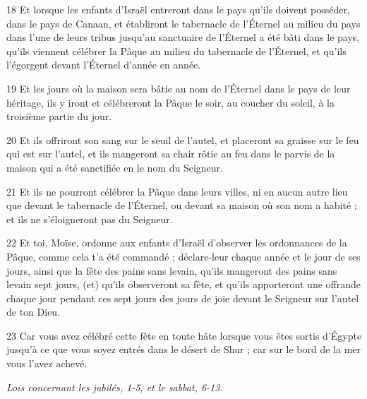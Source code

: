 \par 18 Et lorsque les enfants d'Israël entreront dans le pays qu'ils doivent posséder, dans le pays de Canaan, et établiront le tabernacle de l'Éternel au milieu du pays dans l'une de leurs tribus jusqu'au sanctuaire de l'Éternel a été bâti dans le pays, qu'ils viennent célébrer la Pâque au milieu du tabernacle de l'Éternel, et qu'ils l'égorgent devant l'Éternel d'année en année.
\par 19 Et les jours où la maison sera bâtie au nom de l'Éternel dans le pays de leur héritage, ils y iront et célébreront la Pâque le soir, au coucher du soleil, à la troisième partie du jour.
\par 20 Et ils offriront son sang sur le seuil de l'autel, et placeront sa graisse sur le feu qui est sur l'autel, et ils mangeront sa chair rôtie au feu dans le parvis de la maison qui a été sanctifiée en le nom du Seigneur.
\par 21 Et ils ne pourront célébrer la Pâque dans leurs villes, ni en aucun autre lieu que devant le tabernacle de l'Éternel, ou devant sa maison où son nom a habité ; et ils ne s'éloigneront pas du Seigneur.
\par 22 Et toi, Moïse, ordonne aux enfants d'Israël d'observer les ordonnances de la Pâque, comme cela t'a été commandé ; déclare-leur chaque année et le jour de ses jours, ainsi que la fête des pains sans levain, qu'ils mangeront des pains sans levain sept jours, (et) qu'ils observeront sa fête, et qu'ils apporteront une offrande chaque jour pendant ces sept jours des jours de joie devant le Seigneur sur l'autel de ton Dieu.
\par 23 Car vous avez célébré cette fête en toute hâte lorsque vous êtes sortis d'Égypte jusqu'à ce que vous soyez entrés dans le désert de Shur ; car sur le bord de la mer vous l'avez achevé.


\par \textit{Lois concernant les jubilés, 1-5, et le sabbat, 6-13.}

